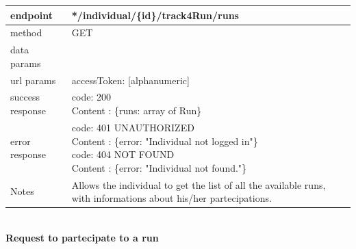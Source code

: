 \begin{legal}
\begin{legal}
\begin{itemize}
								\begin{tabularx}{\linewidth}{| l| l }
									\hline
									endpoint & */individual/\{id\}/track4Run/runs\\
									\hline
									method & GET \\
									\hline
									data params & \\
									\hline
									url params &
									\parbox{0.7\textwidth}{
										\bigskip
										accessToken: [alphanumeric]
										\bigskip
									} \\
									\hline
									success response &
									\parbox{0.7\textwidth}{
										\bigskip
										code: 200\\
										Content : \{runs: array of Run\}
										\bigskip
									} \\
									\hline
									error response &
									\parbox{0.7\textwidth}{
										\bigskip
										code: 401 UNAUTHORIZED \\
										Content : \{error: "Individual not logged in"\}\\
										code: 404 NOT FOUND \\
										Content : \{error: "Individual not found."\}
										\bigskip
									} \\
									\hline
									Notes & 
									\parbox{0.7\textwidth}{
										\bigskip Allows the individual to get the list of all the available runs, with informations about his/her partecipations.
									\bigskip}  \\
									\hline
								\end{tabularx}\\
								\newpage
								\textbf{Request to partecipate to a run} \\
			

\end{itemize}
\end{legal}
\end{legal}

